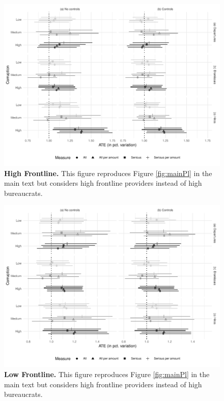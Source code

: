 \documentclass[12pt,a4paper]{article}
\theoremstyle{definition}
\begin{document}
{\begin{figure}[H]
    \centering
    \includegraphics{figures/pl_frontline_high.pdf}
    \caption{{\bf High Frontline.} This figure reproduces Figure \ref{fig:mainPl} in the main text but considers high frontline providers instead of high bureaucrats.}
    \label{fig:plHighFrontline}
\end{figure}

\begin{figure}[H]
    \centering
    \includegraphics{figures/pl_frontline_low.pdf}
    \caption{{\bf Low Frontline.} This figure reproduces Figure \ref{fig:mainPl} in the main text but considers high frontline providers instead of high bureaucrats.}
    \label{fig:plLowFrontline}
\end{figure}

}
\end{document}
